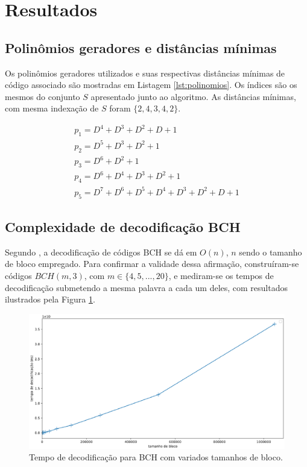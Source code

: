 \section{Resultados}
\subsection{Polinômios geradores e distâncias mínimas}
Os polinômios geradores utilizados e suas respectivas distâncias mínimas de código associado são mostradas em Listagem \ref{lst:polinomios}. Os índices são os mesmos do conjunto $S$ apresentado junto ao algoritmo. As distâncias mínimas, com mesma indexação de $S$ foram $\{2, 4, 3, 4, 2\}$.

\begin{align}
	\nonumber
	p_1 = D^4+D^3+D^2+D+1\\ \nonumber
	p_2 = D^5+D^3+D^2+1\\ \nonumber
	p_3 = D^6+D^2+1\\ \nonumber
	p_4 = D^6+D^4+D^3+D^2+1\\
	p_5 = D^7+D^6+D^5+D^4+D^3+D^2+D+1
	\label{lst:polinomios}
\end{align}

\subsection{\label{complexidade_decod}Complexidade de decodificação BCH}

Segundo \cite{ref:algoritmo-berlekamp}, a decodificação de códigos BCH se dá em $O(n)$, $n$ sendo o tamanho de bloco empregado. Para confirmar a validade dessa afirmação, construíram-se códigos $BCH(m, 3)$, com $m \in \lbrace 4,5,...,20 \rbrace$, e mediram-se os tempos de decodificação submetendo a mesma palavra a cada um deles, com resultados ilustrados pela Figura \ref{fig:bch_decoding_is_linear}.

\begin{figure}[!hb]
	\centering
    \captionsetup{justification=centering}
	\includegraphics[scale=0.3]{floats/bch-decode-is-linear.eps}
	\caption{\label{fig:bch_decoding_is_linear}Tempo de decodificação para BCH com variados tamanhos de bloco.}
\end{figure}

